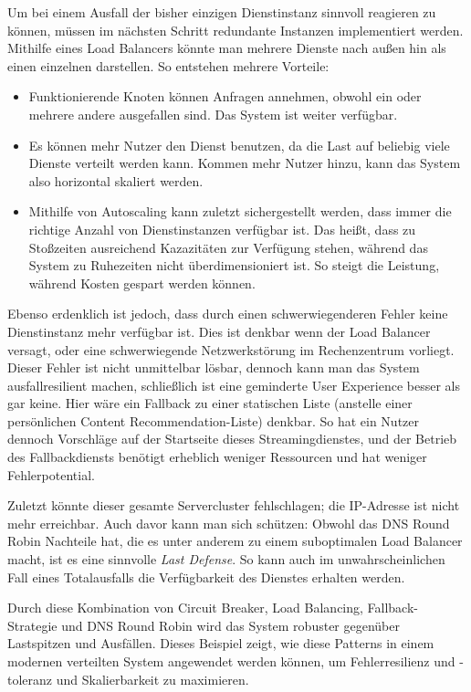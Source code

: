 Um bei einem Ausfall der bisher einzigen Dienstinstanz sinnvoll reagieren zu können, müssen im nächsten Schritt redundante Instanzen implementiert werden. Mithilfe eines Load Balancers könnte man mehrere Dienste nach außen hin als einen einzelnen darstellen. So entstehen mehrere Vorteile: 
\begin{itemize}
	\item Funktionierende Knoten können Anfragen annehmen, obwohl ein oder mehrere andere ausgefallen sind. Das System ist weiter verfügbar.
	\item Es können mehr Nutzer den Dienst benutzen, da die Last auf beliebig viele Dienste verteilt werden kann. Kommen mehr Nutzer hinzu, kann das System also horizontal skaliert werden.
	\item Mithilfe von Autoscaling kann zuletzt sichergestellt werden, dass immer die richtige Anzahl von Dienstinstanzen verfügbar ist. Das heißt, dass zu Stoßzeiten ausreichend Kazazitäten zur Verfügung stehen, während das System zu Ruhezeiten nicht überdimensioniert ist. So steigt die Leistung, während Kosten gespart werden können.
\end{itemize}

Ebenso erdenklich ist jedoch, dass durch einen schwerwiegenderen Fehler keine Dienstinstanz mehr verfügbar ist. Dies ist denkbar wenn der Load Balancer versagt, oder eine schwerwiegende Netzwerkstörung im Rechenzentrum vorliegt. Dieser Fehler ist nicht unmittelbar lösbar, dennoch kann man das System ausfallresilient machen, schließlich ist eine geminderte User Experience besser als gar keine. Hier wäre ein Fallback zu einer statischen Liste (anstelle einer persönlichen Content Recommendation-Liste) denkbar. So hat ein Nutzer dennoch Vorschläge auf der Startseite dieses Streamingdienstes, und der Betrieb des Fallbackdiensts benötigt erheblich weniger Ressourcen und hat weniger Fehlerpotential.

Zuletzt könnte dieser gesamte Servercluster fehlschlagen; die IP-Adresse ist nicht mehr erreichbar. Auch davor kann man sich schützen: Obwohl das DNS Round Robin Nachteile hat, die es unter anderem zu einem suboptimalen Load Balancer macht, ist es eine sinnvolle \textit{Last Defense}. So kann auch im unwahrscheinlichen Fall eines Totalausfalls die Verfügbarkeit des Dienstes erhalten werden.

Durch diese Kombination von Circuit Breaker, Load Balancing, Fallback-Strategie und DNS Round Robin wird das System robuster gegenüber Lastspitzen und Ausfällen. Dieses Beispiel zeigt, wie diese Patterns in einem modernen verteilten System angewendet werden können, um Fehlerresilienz und -toleranz und Skalierbarkeit zu maximieren.

